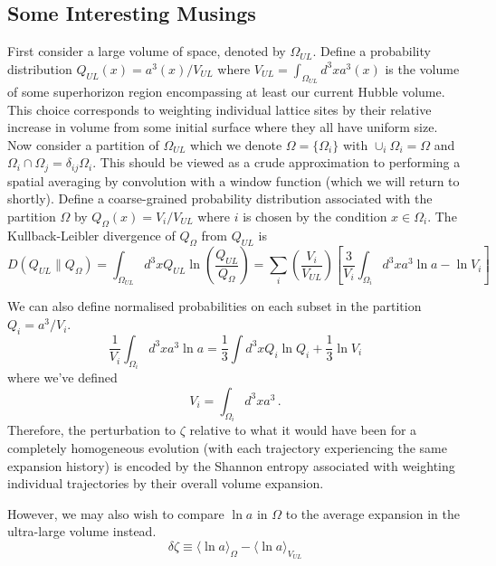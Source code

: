 \documentclass[11pt,a4paper]{article}
\begin{document}




\subsection{Some Interesting Musings}
First consider a large volume of space, denoted by $\Omega_{UL}$.
Define a probability distribution $Q_{UL}(x) = a^3(x) / V_{UL}$ where $V_{UL} = \int_{\Omega_{UL}}d^3x a^3(x)$ is the volume of some superhorizon region encompassing at least our current Hubble volume.
This choice corresponds to weighting individual lattice sites by their relative increase in volume from some initial surface where they all have uniform size.
Now consider a partition of $\Omega_{UL}$ which we denote $\Omega = \{\Omega_i\}$ with $\cup_i \Omega_i = \Omega$ and $\Omega_i \cap \Omega_j = \delta_{ij}\Omega_i$.
This should be viewed as a crude approximation to performing a spatial averaging by convolution with a window function (which we will return to shortly).
Define a coarse-grained probability distribution associated with the partition $\Omega$ by $Q_\Omega(x) = V_i / V_{UL}$ where $i$ is chosen by the condition $x \in \Omega_i$.
The Kullback-Leibler divergence of $Q_\Omega$ from $Q_{UL}$ is
\begin{equation}
  D(Q_{UL} \parallel Q_\Omega) = \int_{\Omega_{UL}} d^3x Q_{UL}\ln\left(\frac{Q_{UL}}{Q_\Omega}\right) = \sum_i \left(\frac{V_i}{V_{UL}}\right)\left[\frac{3}{V_i}\int_{\Omega_i}d^3xa^3\ln a -\ln V_i\right]
\end{equation}

We can also define normalised probabilities on each subset in the partition $Q_i = a^3 / V_i$.
\begin{equation}
  \frac{1}{V_i}\int_{\Omega_i} d^3x a^3\ln a = \frac{1}{3} \int d^3x Q_i\ln Q_i + \frac{1}{3}\ln V_i
\end{equation}
where we've defined
\begin{equation}
  V_i = \int_{\Omega_i} d^3x a^3 \, .
\end{equation}
Therefore, the perturbation to $\zeta$ relative to what it would have been for a completely homogeneous evolution (with each trajectory experiencing the same expansion history) is encoded by the Shannon entropy associated with weighting individual trajectories by their overall volume expansion.

However, we may also wish to compare $\ln a$ in $\Omega$ to the average expansion in the ultra-large volume instead.
\begin{equation}
  \delta\zeta \equiv \langle \ln a \rangle_\Omega - \langle \ln a \rangle_{V_{UL}}
\end{equation}
\end{document}
